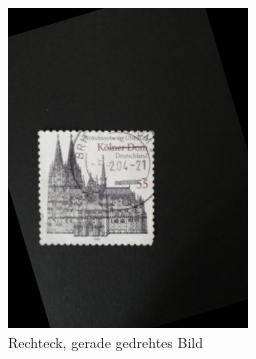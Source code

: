 \documentclass[12pt,toc=bib,toc=listof]{scrreprt}
\begin{document}
\begin{figure}[h]
\begin{minipage}[t]{.2\linewidth}
  \includegraphics[width=\linewidth]{./bilder/rot_col}
  \caption{Rechteck, gerade gedrehtes Bild}
  \label{fig:bv_rotimg}
\end{minipage}
\end{figure}
\end{document}
